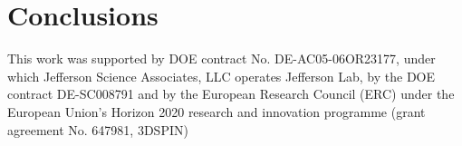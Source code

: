\documentclass[preprintnumbers,floatfix,nofootinbib]{revtex4}
\begin{document}
\section{Conclusions}



\begin{acknowledgments}
This work was supported by DOE contract No. DE-AC05-06OR23177,
under which Jefferson Science Associates, LLC operates Jefferson Lab, by the DOE contract DE-SC008791 and 
by the European Research Council (ERC) under the European Union's 
Horizon 2020 research and innovation programme (grant agreement No. 647981,
3DSPIN)
\end{acknowledgments}




\end{document}
